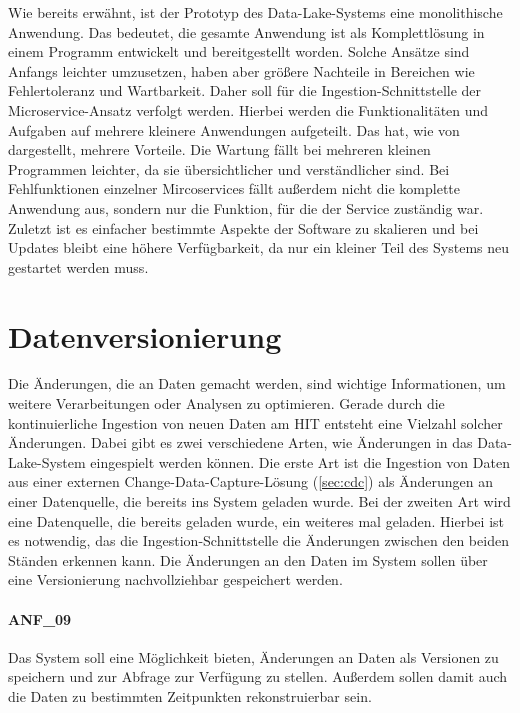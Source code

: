 Wie bereits erwähnt, ist der Prototyp des Data-Lake-Systems eine monolithische Anwendung.
Das bedeutet, die gesamte Anwendung ist als Komplettlösung in einem Programm entwickelt und bereitgestellt worden.
Solche Ansätze sind Anfangs leichter umzusetzen, haben aber größere Nachteile in Bereichen wie Fehlertoleranz und Wartbarkeit.
Daher soll für die Ingestion-Schnittstelle der Microservice-Ansatz verfolgt werden.
Hierbei werden die Funktionalitäten und Aufgaben auf mehrere kleinere Anwendungen aufgeteilt.
Das hat, wie von \textcite{microservices} dargestellt, mehrere Vorteile.
Die Wartung fällt bei mehreren kleinen Programmen leichter, da sie übersichtlicher und verständlicher sind.
Bei Fehlfunktionen einzelner Mircoservices fällt außerdem nicht die komplette Anwendung aus, sondern nur die Funktion, für die der Service zuständig war.
Zuletzt ist es einfacher bestimmte Aspekte der Software zu skalieren und bei Updates bleibt eine höhere Verfügbarkeit, da nur ein kleiner Teil des Systems neu gestartet werden muss.

\section{Datenversionierung}
\label{sec:anf-vers}
Die Änderungen, die an Daten gemacht werden, sind wichtige Informationen, um weitere Verarbeitungen oder Analysen zu optimieren.
Gerade durch die kontinuierliche Ingestion von neuen Daten am HIT entsteht eine Vielzahl solcher Änderungen.
Dabei gibt es zwei verschiedene Arten, wie Änderungen in das Data-Lake-System eingespielt werden können.
Die erste Art ist die Ingestion von Daten aus einer externen Change-Data-Capture-Lösung (\cref{sec:cdc}) als Änderungen an einer Datenquelle, die bereits ins System geladen wurde.
Bei der zweiten Art wird eine Datenquelle, die bereits geladen wurde, ein weiteres mal geladen.
Hierbei ist es notwendig, das die Ingestion-Schnittstelle die Änderungen zwischen den beiden Ständen erkennen kann.
Die Änderungen an den Daten im System sollen über eine Versionierung nachvollziehbar gespeichert werden.

\paragraph{ANF\_09}
\label{ANF_09}
Das System soll eine Möglichkeit bieten, Änderungen an Daten als Versionen zu speichern und zur Abfrage zur Verfügung zu stellen.
Außerdem sollen damit auch die Daten zu bestimmten Zeitpunkten rekonstruierbar sein.

